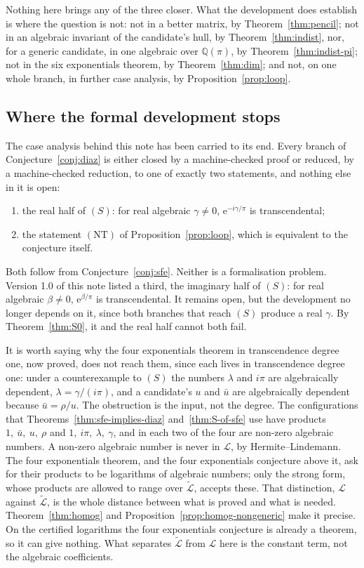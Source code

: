 \documentclass[11pt,a4paper]{article}
\theoremstyle{plain}
\theoremstyle{definition}
\newcommand{\e}{\mathrm{e}}
\newcommand{\Q}{\mathbb{Q}}
\newcommand{\Logs}{\mathcal{L}}
\newcommand{\aLogs}{\widetilde{\mathcal{L}}}
\begin{document}
Nothing here brings any of the three closer. What the development does establish is where the
question is not: not in a better matrix, by Theorem~\ref{thm:pencil}; not in an algebraic
invariant of the candidate's hull, by Theorem~\ref{thm:indist}, nor, for a generic candidate, in
one algebraic over $\Q(\pi)$, by Theorem~\ref{thm:indist-pi}; not in the six exponentials
theorem, by Theorem~\ref{thm:dim}; and not, on one whole branch, in further case analysis, by
Proposition~\ref{prop:loop}.

\subsection*{Where the formal development stops}

The case analysis behind this note has been carried to its end. Every branch of
Conjecture~\ref{conj:diaz} is either closed by a machine-checked proof or reduced, by a
machine-checked reduction, to one of exactly two statements, and nothing else in it is open:
\begin{enumerate}[label=\textup{(\roman*)}]
  \item the real half of $(S)$: for real algebraic $\gamma\neq0$, $\e^{-i\gamma/\pi}$ is
        transcendental;
  \item the statement $(\mathrm{NT})$ of Proposition~\ref{prop:loop}, which is equivalent to the
        conjecture itself.
\end{enumerate}
Both follow from Conjecture~\ref{conj:sfe}. Neither is a formalisation problem. Version 1.0 of
this note listed a third, the imaginary half of $(S)$: for real algebraic $\beta\neq0$,
$\e^{\beta/\pi}$ is transcendental. It remains open, but the development no longer depends on it,
since both branches that reach $(S)$ produce a real $\gamma$. By Theorem~\ref{thm:S0}, it and the
real half cannot both fail.

It is worth saying why the four exponentials theorem in transcendence degree one, now proved, does
not reach them, since each lives in transcendence degree one: under a counterexample to $(S)$ the
numbers $\lambda$ and $i\pi$ are algebraically dependent, $\lambda=\gamma/(i\pi)$, and a
candidate's $u$ and $\bar u$ are algebraically dependent because $\bar u=\rho/u$. The obstruction is the input,
not the degree. The configurations that
Theorems~\ref{thm:sfe-implies-diaz} and~\ref{thm:S-of-sfe} use have products
$1,\ \bar u,\ u,\ \rho$ and $1,\ i\pi,\ \lambda,\ \gamma$, and in each two of the four are non-zero
algebraic numbers. A non-zero algebraic number is never in $\Logs$, by Hermite--Lindemann. The
four exponentials theorem, and the four exponentials conjecture above it, ask for their products
to be logarithms of algebraic numbers; only the strong form, whose products are allowed to range
over $\aLogs$, accepts these.
That distinction, $\Logs$ against $\aLogs$, is the whole distance between what is proved and what
is needed. Theorem~\ref{thm:homog} and Proposition~\ref{prop:homog-nongeneric} make it precise.
On the certified logarithms the four exponentials conjecture is already a theorem, so it can give
nothing. What separates $\aLogs$ from $\Logs$ here is the constant term, not the algebraic
coefficients.
\end{document}
